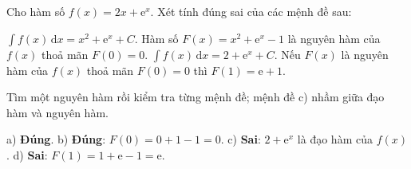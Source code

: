 \begin{viduds}
Cho hàm số $f(x)=2x+\mathrm e^x$. Xét tính đúng sai của các mệnh đề sau:
\begin{dungsai}
  \y $\displaystyle\int f(x)\,\mathrm dx=x^2+\mathrm e^x+C$. \oDS
  \y Hàm số $F(x)=x^2+\mathrm e^x-1$ là nguyên hàm của $f(x)$ thoả mãn $F(0)=0$. \oDS
  \y $\displaystyle\int f(x)\,\mathrm dx=2+\mathrm e^x+C$. \oDS
  \y Nếu $F(x)$ là nguyên hàm của $f(x)$ thoả mãn $F(0)=0$ thì $F(1)=\mathrm e+1$. \oDS
\end{dungsai}
\begin{loigiai}
\tuduy Tìm một nguyên hàm rồi kiểm tra từng mệnh đề; mệnh đề c) nhầm giữa đạo hàm và nguyên hàm.

a) \textbf{Đúng}. b) \textbf{Đúng}: $F(0)=0+1-1=0$. c) \textbf{Sai}: $2+\mathrm e^x$ là đạo hàm của $f(x)$. d) \textbf{Sai}: $F(1)=1+\mathrm e-1=\mathrm e$.
\end{loigiai}
\end{viduds}
